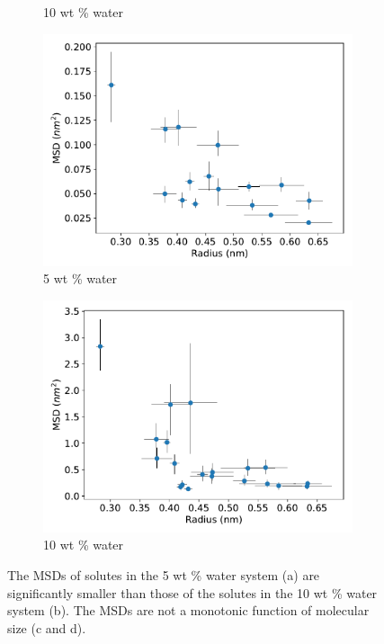 \documentclass{article}
\begin{document}
\begin{figure}
\begin{subfigure}{0.45\textwidth}
  \caption{10 wt \% water}\label{fig:all_msds_10wt}
  \end{subfigure}
  \begin{subfigure}{0.45\textwidth}
  \includegraphics[width=\textwidth]{msd_radius_5wt.pdf} 
  \caption{5 wt \% water}\label{fig:msd_radius_5wt}
  \end{subfigure}
  \begin{subfigure}{0.45\textwidth}
  \includegraphics[width=\textwidth]{msd_radius_10wt.pdf} 
  \caption{10 wt \% water}\label{fig:msd_radius_10wt}
  \end{subfigure}
  \caption{The MSDs of solutes in the 5 wt \% water system (a) are significantly
  smaller than those of the solutes in the 10 wt \% water system (b). The
  MSDs are not a monotonic function of molecular size (c and d).}\label{fig:msds}
  \end{figure}  
\end{document}
